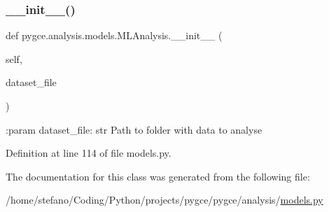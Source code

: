 \subsubsection{\texorpdfstring{\+\_\+\+\_\+init\+\_\+\+\_\+()}{\_\_init\_\_()}}
{\footnotesize\ttfamily def pygce.\+analysis.\+models.\+M\+L\+Analysis.\+\_\+\+\_\+init\+\_\+\+\_\+ (\begin{DoxyParamCaption}\item[{}]{self,  }\item[{}]{dataset\+\_\+file }\end{DoxyParamCaption})}

\begin{DoxyVerb}:param dataset_file: str
    Path to folder with data to analyse
\end{DoxyVerb}
 

Definition at line 114 of file models.\+py.



The documentation for this class was generated from the following file\+:\begin{DoxyCompactItemize}
\item 
/home/stefano/\+Coding/\+Python/projects/pygce/pygce/analysis/\hyperlink{models_8py}{models.\+py}\end{DoxyCompactItemize}
